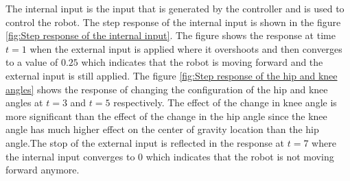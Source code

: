 The internal input is the input that is generated by the controller and is used to control the robot.
The step response of the internal input is shown in the figure \ref{fig:Step response of the internal input}. The figure shows the response at time $t=1$ when the external input is applied where it overshoots and then converges to a value of $0.25$ which indicates that the robot is moving forward and the external input is still applied. The figure \ref{fig:Step response of the hip and knee angles} shows the response of changing the configuration of the hip and knee angles  at $t=3$ and $t=5$ respectively. The effect of the change in knee angle is more significant than the effect of the change in the hip angle since the knee angle has much higher effect on the center of gravity location than the hip angle.The stop of the external input is reflected in the response at $t=7$ where the internal input converges to $0$ which indicates that the robot is not moving forward anymore.
